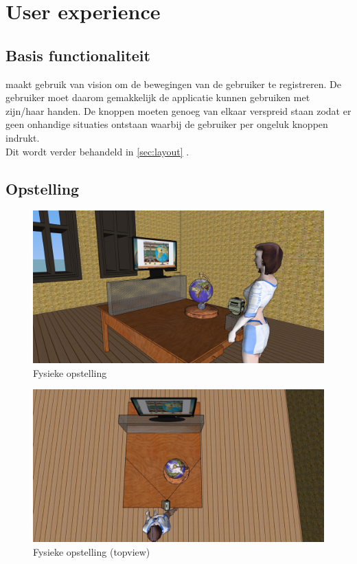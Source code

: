 \chapter{User experience} \label{cha:userexperience}

\section{Basis functionaliteit} \label{sec:basis}
\projectname maakt gebruik van vision om de bewegingen van de gebruiker te registreren. De gebruiker moet daarom gemakkelijk de applicatie kunnen gebruiken met zijn/haar handen. De knoppen moeten genoeg van elkaar verspreid staan zodat er geen onhandige situaties ontstaan waarbij de gebruiker per ongeluk knoppen indrukt.\\
Dit wordt verder behandeld in \cref{sec:layout} .

\newpage
\section{Opstelling} \label{sec:setup}
\begin{figure}[h]
	\includegraphics[width=130mm]{figs/screen1.jpg}
	\caption{Fysieke opstelling}
	\label{fig:screen1}
\end{figure}

\begin{figure}[h]
	\includegraphics[width=130mm]{figs/screen2.jpg}
	\caption{Fysieke opstelling (topview)}
	\label{fig:screen2}
\end{figure}

